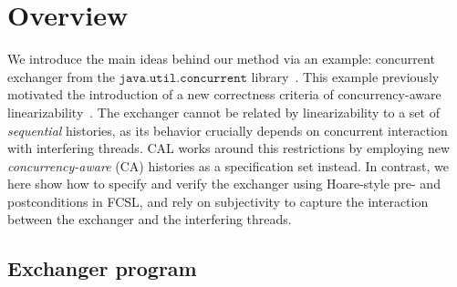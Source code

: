 \section{Overview}
\label{sec:overview}


We introduce the main ideas behind our method via an example:
concurrent exchanger from the $\mathtt{java.util.concurrent}$
library~\cite{Scherer-al:SCOOL05,ExchangerClass}. This example
previously motivated the introduction of a new correctness criteria of
concurrency-aware
linearizability~\cite{Hemed-Rinetzky:PODC14,Hemed-al:DISC15}. The
exchanger cannot be related by linearizability to a set of
\emph{sequential} histories, as its behavior crucially depends on
concurrent interaction with interfering threads.
%
CAL works around this restrictions by employing new
\emph{concurrency-aware} (CA) histories as a specification set
instead.
%
In contrast, we here show how to specify and verify the exchanger
using Hoare-style pre- and postconditions in FCSL, and rely on
subjectivity to capture the interaction between the exchanger and the
interfering threads.

\subsection{Exchanger program} 
\label{sec:exchanger}

\newcommand{\Unmatched}{{\mathsf{U}}}
\newcommand{\Matched}[1]{{\mathsf{M}\ #1}}
\newcommand{\Retired}{{\mathsf{R}}}

